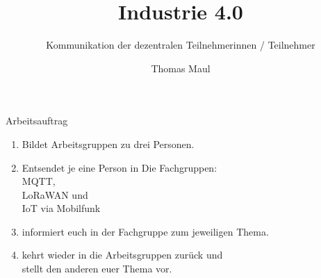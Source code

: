 \documentclass[aspectratio=169]{beamer}
\title{Industrie 4.0}
\subtitle{Kommunikation der dezentralen Teilnehmerinnen / Teilnehmer}
\author{Thomas Maul}
\institute[BWS Hofheim]{Brühlwiesenschule, Hofheim}
\begin{document}
\begin{frame}
  \titlepage
\end{frame}

\begin{frame}{Arbeitsauftrag}
    \begin{enumerate}
        \item Bildet Arbeitsgruppen zu drei Personen.
        \pause
        \item Entsendet je eine Person in Die Fachgruppen:\\MQTT,
        \\LoRaWAN und  \\ IoT via Mobilfunk
        \item informiert euch in der Fachgruppe zum jeweiligen Thema.
        \pause
        \item kehrt wieder in die Arbeitsgruppen zurück und\\ stellt den anderen euer Thema vor.
    \end{enumerate}
\end{frame}
\end{document}
